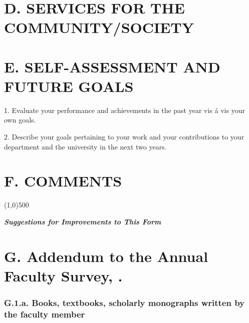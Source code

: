 \documentclass[12pt]{article}
\begin{document}
{{%


\section*{D. SERVICES FOR THE COMMUNITY/SOCIETY}


\section*{E. SELF-ASSESSMENT AND FUTURE GOALS}

1. Evaluate your performance and achievements in the past year vis á vis your own goals. 

2. Describe your goals pertaining to your work and your contributions to your department and the university in the next two years. 


\section*{F. COMMENTS}




\begin{center}
\line(1,0){500}
\end{center}
{\large\textbf {\textit {Suggestions for Improvements to This Form}}}




\section*{G. Addendum to the Annual Faculty Survey, \the\year.}

\subsubsection*{G.1.a. Books, textbooks, scholarly monographs written by the faculty member}

}}
\end{document}
